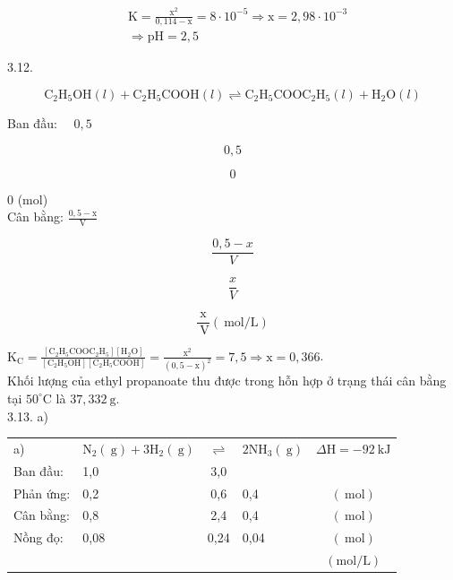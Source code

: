 \documentclass[10pt]{article}
\begin{document}
$$
\begin{aligned}
& \mathrm{K}=\frac{\mathrm{x}^{2}}{0,114-\mathrm{x}}=8 \cdot 10^{-5} \Rightarrow \mathrm{x}=2,98 \cdot 10^{-3} \\
& \Rightarrow \mathrm{pH}=2,5
\end{aligned}
$$

3.12.

$$
\mathrm{C}_{2} \mathrm{H}_{5} \mathrm{OH}(l)+\mathrm{C}_{2} \mathrm{H}_{5} \mathrm{COOH}(l) \rightleftharpoons \mathrm{C}_{2} \mathrm{H}_{5} \mathrm{COOC}_{2} \mathrm{H}_{5}(l)+\mathrm{H}_{2} \mathrm{O}(l)
$$

Ban đầu: $\quad 0,5$

$$
0,5
$$

$$
0
$$

0 (mol)\\
Cân bằng: $\frac{0,5-\mathrm{x}}{\mathrm{V}}$

$$
\frac{0,5-x}{V}
$$

$$
\frac{x}{V}
$$

$$
\frac{\mathrm{x}}{\mathrm{~V}}(\mathrm{~mol} / \mathrm{L})
$$

$\mathrm{K}_{\mathrm{C}}=\frac{\left[\mathrm{C}_{2} \mathrm{H}_{5} \mathrm{COOC}_{2} \mathrm{H}_{5}\right]\left[\mathrm{H}_{2} \mathrm{O}\right]}{\left[\mathrm{C}_{2} \mathrm{H}_{5} \mathrm{OH}\right]\left[\mathrm{C}_{2} \mathrm{H}_{5} \mathrm{COOH}\right]}=\frac{\mathrm{x}^{2}}{(0,5-\mathrm{x})^{2}}=7,5 \Rightarrow \mathrm{x}=0,366$.\\
Khối lượng của ethyl propanoate thu được trong hỗn hợp ở trạng thái cân bằng tại $50^{\circ} \mathrm{C}$ là $37,332 \mathrm{~g}$.\\
3.13. a)

\begin{center}
\begin{tabular}{llclc}
a) & $\mathrm{N}_{2}(\mathrm{~g})+3 \mathrm{H}_{2}(\mathrm{~g})$ & $\rightleftharpoons$ & $2 \mathrm{NH}_{3}(\mathrm{~g})$ & $\Delta \mathrm{H}=-92 \mathrm{~kJ}$ \\
Ban đầu: & 1,0 & 3,0 &  &  \\
Phản ứng: & 0,2 & 0,6 & 0,4 & $(\mathrm{~mol})$ \\
Cân bằng: & 0,8 & 2,4 & 0,4 & $(\mathrm{~mol})$ \\
Nồng đọ: & 0,08 & 0,24 & 0,04 & $(\mathrm{~mol})$ \\
 &  &  &  & $(\mathrm{mol} / \mathrm{L})$ \\
\end{tabular}
\end{center}
\end{document}
